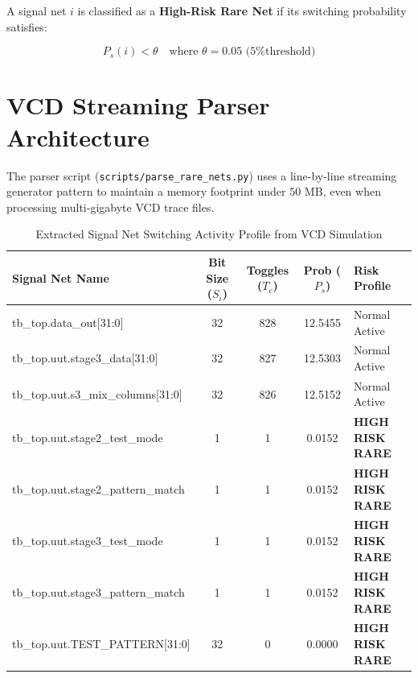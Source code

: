 \documentclass[11pt,a4paper,oneside]{book}
\begin{document}
A signal net $i$ is classified as a \textbf{High-Risk Rare Net} if its switching probability satisfies:

\begin{equation}
P_s(i) < \theta \quad \text{where } \theta = 0.05 \text{ (5\% threshold)}
\end{equation}

\section{VCD Streaming Parser Architecture}

The parser script (\texttt{scripts/parse\_rare\_nets.py}) uses a line-by-line streaming generator pattern to maintain a memory footprint under $50\text{~MB}$, even when processing multi-gigabyte VCD trace files.

\begin{table}[h!]
\centering
\footnotesize
\begin{tabularx}{\textwidth}{>{\ttfamily}l c c c X}
\toprule
\textbf{Signal Net Name} & \textbf{Bit Size ($S_i$)} & \textbf{Toggles ($T_c$)} & \textbf{Prob ($P_s$)} & \textbf{Risk Profile} \\
\midrule
tb\_top.data\_out[31:0] & 32 & 828 & 12.5455 & Normal Active \\
tb\_top.uut.stage3\_data[31:0] & 32 & 827 & 12.5303 & Normal Active \\
tb\_top.uut.s3\_mix\_columns[31:0] & 32 & 826 & 12.5152 & Normal Active \\
\hline
tb\_top.uut.stage2\_test\_mode & 1 & 1 & 0.0152 & \textbf{HIGH RISK RARE} \\
tb\_top.uut.stage2\_pattern\_match & 1 & 1 & 0.0152 & \textbf{HIGH RISK RARE} \\
tb\_top.uut.stage3\_test\_mode & 1 & 1 & 0.0152 & \textbf{HIGH RISK RARE} \\
tb\_top.uut.stage3\_pattern\_match & 1 & 1 & 0.0152 & \textbf{HIGH RISK RARE} \\
tb\_top.uut.TEST\_PATTERN[31:0] & 32 & 0 & 0.0000 & \textbf{HIGH RISK RARE} \\
\bottomrule
\end{tabularx}
\caption{Extracted Signal Net Switching Activity Profile from VCD Simulation}
\label{tab:rare_nets_table}
\end{table}

\end{document}
